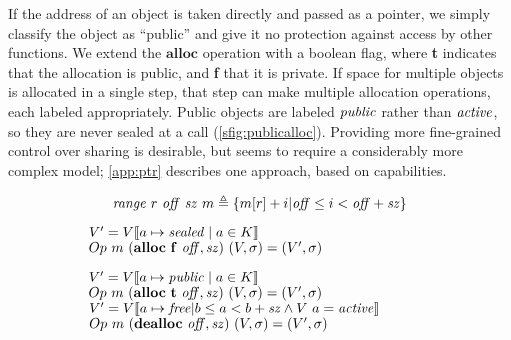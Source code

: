 \documentclass[10pt,conference]{ieeetran}%
\theoremstyle{definition}
\begin{document}
If the address of an object is taken directly and passed as a
pointer, we simply classify the object as ``public'' and give it no protection against
access by other functions. We extend the \(\mathbf{alloc}\) operation
with a boolean flag, where {\bf t} indicates
that the allocation is public, and {\bf f} that it is private.
If space for multiple objects is allocated in a single step,
that step can make multiple allocation operations, each labeled appropriately.
Public objects are labeled \(\mathit{public}\) rather than \(\mathit{active}\), so they are
never sealed at a call (\cref{sfig:publicalloc}).
Providing more fine-grained control over sharing is desirable, but
seems to require a considerably more complex model; \cref{app:ptr} describes one
approach, based on capabilities.


\begin{figure*}
  \begin{subfigure}{0.4\textwidth}
    \[\mathit{range} ~ r ~ \mathit{off} ~ \mathit{sz} ~ m \triangleq
    \{m[r]+i | \mathit{off} \leq i < \mathit{off+sz}\}\]

               {\(V' = V \llbracket a \mapsto \mathit{sealed} \mid a \in K \rrbracket\)}
               {\(Op ~ m ~ (\mathbf{alloc} ~ \mathbf{f} ~ \mathit{off, sz}) ~ (V,\sigma) = (V',\sigma)\)}

               {\(V' = V \llbracket a \mapsto \mathit{public} \mid a \in K \rrbracket\)}
               {\(Op ~ m ~ (\mathbf{alloc} ~ \mathbf{t} ~ \mathit{off, sz}) ~ (V,\sigma) = (V',\sigma)\)}
               {\(V' = V \llbracket a \mapsto \mathit{free} |
                 b \leq a < b+\mathit{sz} \land V ~ a = \mathit{active} \rrbracket\)}
               {\(Op ~ m ~ (\mathbf{dealloc} ~ \mathit{off, sz}) ~ (V,\sigma) = (V',\sigma)\)}


\end{subfigure}
\end{figure*}
\end{document}
